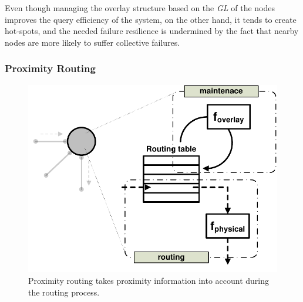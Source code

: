 Even though managing the overlay structure based on the \emph{GL} of the
nodes improves the query efficiency of the system, on the other hand, it tends
to create hot-spots, and the needed failure resilience is undermined by the fact
that nearby nodes are more likely to suffer collective failures.


%
%
%

\subsubsection{Proximity Routing}

\begin{figure}[ht]
\centering
  \includegraphics[scale=0.4]{img/pdf/proximity-routing.pdf}
\caption{Proximity routing takes proximity information into account during the
routing process.}
\label{figure:proximity-routing}
\end{figure}

